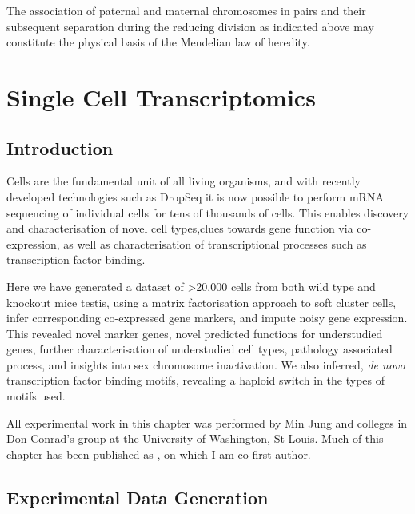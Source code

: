 \begin{savequote}[8cm]
The association of paternal and maternal chromosomes in pairs and their subsequent separation during the reducing division as indicated above may constitute the physical basis of the Mendelian law of heredity.
\end{savequote}

\chapter{\label{ch:2-SDA} Single Cell Transcriptomics}

\minitoc

\section{Introduction}
Cells are the fundamental unit of all living organisms, and with recently developed technologies such as DropSeq it is now possible to perform mRNA sequencing of individual cells for tens of thousands of cells. This enables discovery and characterisation of novel cell types,clues towards gene function via co-expression, as well as characterisation of transcriptional processes such as transcription factor binding.

Here we have generated a dataset of >20,000 cells from both wild type and knockout mice testis, using a matrix factorisation approach to soft cluster cells, infer corresponding co-expressed gene markers, and impute noisy gene expression. This revealed novel marker genes, novel predicted functions for understudied genes, further characterisation of understudied cell types, pathology associated process, and insights into sex chromosome inactivation. We also inferred, \emph{de novo} transcription factor binding motifs, revealing a haploid switch in the types of motifs used.

\vspace{0.7cm}
\begin{framed}
\noindent All experimental work in this chapter was performed by Min Jung and colleges in Don Conrad's group at the University of Washington, St Louis. Much of this chapter has been published as \cite{Jung2019Unified}, on which I am co-first author.
\end{framed}

\section{Experimental Data Generation}

